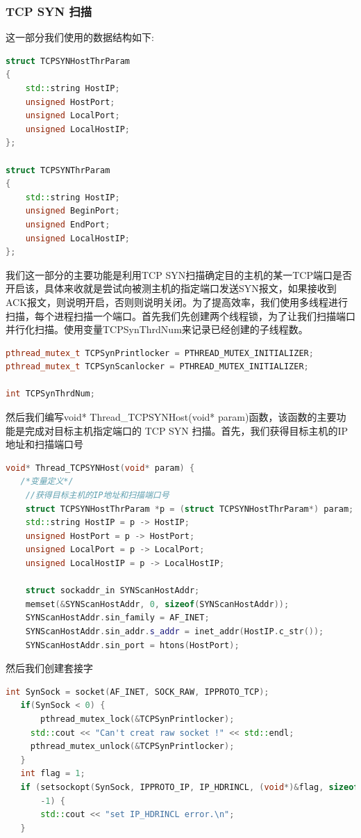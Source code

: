\documentclass[UTF8,a4paper,10pt]{ctexart}
\begin{document}
\subsubsection{TCP SYN 扫描}
这一部分我们使用的数据结构如下:
\begin{lstlisting}[language=C++]
struct TCPSYNHostThrParam
{
	std::string HostIP;
	unsigned HostPort;
    unsigned LocalPort;
	unsigned LocalHostIP;
};

struct TCPSYNThrParam
{
	std::string HostIP;
	unsigned BeginPort;
	unsigned EndPort;
	unsigned LocalHostIP;
};
\end{lstlisting}
我们这一部分的主要功能是利用TCP SYN扫描确定目的主机的某一TCP端口是否开启该，具体来收就是尝试向被测主机的指定端口发送SYN报文，如果接收到ACK报文，则说明开启，否则则说明关闭。为了提高效率，我们使用多线程进行扫描，每个进程扫描一个端口。首先我们先创建两个线程锁，为了让我们扫描端口并行化扫描。使用变量TCPSynThrdNum来记录已经创建的子线程数。
\begin{lstlisting}[language = C++]
pthread_mutex_t TCPSynPrintlocker = PTHREAD_MUTEX_INITIALIZER;
pthread_mutex_t TCPSynScanlocker = PTHREAD_MUTEX_INITIALIZER;

int TCPSynThrdNum;
\end{lstlisting}
然后我们编写void* Thread\_TCPSYNHost(void* param)函数，该函数的主要功能是完成对目标主机指定端口的 TCP SYN 扫描。首先，我们获得目标主机的IP地址和扫描端口号
\begin{lstlisting}[language = C++]
void* Thread_TCPSYNHost(void* param) {
   /*变量定义*/
    //获得目标主机的IP地址和扫描端口号
    struct TCPSYNHostThrParam *p = (struct TCPSYNHostThrParam*) param;
    std::string HostIP = p -> HostIP;
    unsigned HostPort = p -> HostPort;
    unsigned LocalPort = p -> LocalPort;
	unsigned LocalHostIP = p -> LocalHostIP;

    struct sockaddr_in SYNScanHostAddr;
    memset(&SYNScanHostAddr, 0, sizeof(SYNScanHostAddr));
    SYNScanHostAddr.sin_family = AF_INET;
    SYNScanHostAddr.sin_addr.s_addr = inet_addr(HostIP.c_str());
    SYNScanHostAddr.sin_port = htons(HostPort);
\end{lstlisting}
然后我们创建套接字
\begin{lstlisting}[language = C++]
   int SynSock = socket(AF_INET, SOCK_RAW, IPPROTO_TCP);
   if(SynSock < 0) {
       pthread_mutex_lock(&TCPSynPrintlocker);
     std::cout << "Can't creat raw socket !" << std::endl;
     pthread_mutex_unlock(&TCPSynPrintlocker);
   }
   int flag = 1;
   if (setsockopt(SynSock, IPPROTO_IP, IP_HDRINCL, (void*)&flag, sizeof(int)) ==
       -1) {
       std::cout << "set IP_HDRINCL error.\n";
   }
\end{lstlisting}
\end{document}
